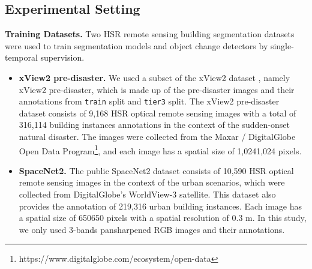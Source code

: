\documentclass[10pt,twocolumn,letterpaper]{article}
\begin{document}
\subsection{Experimental Setting}


\noindent\textbf{Training Datasets.}
Two HSR remote sensing building segmentation datasets were used to train segmentation models and object change detectors by single-temporal supervision.
\begin{itemize}
    \vspace{-0.1in}
    \item \textbf{xView2 pre-disaster.} We used a subset of the xView2 dataset \cite{gupta2019creating}, namely xView2 pre-disaster, which is made up of the pre-disaster images and their annotations from \texttt{train} split and \texttt{tier3} split.
          The xView2 pre-disaster dataset consists of 9,168 HSR optical remote sensing images with a total of 316,114 building instances annotations in the context of the sudden-onset natural disaster.
          The images were collected from the Maxar / DigitalGlobe Open Data Program\footnote{https://www.digitalglobe.com/ecosystem/open-data}, and each image has a spatial size of 1,0241,024 pixels.
          \vspace{-0.1in}
    \item \textbf{SpaceNet2.}
          The public SpaceNet2 dataset \cite{van2018spacenet} consists of 10,590 HSR optical remote sensing images in the context of the urban scenarios, which were collected from DigitalGlobe's WorldView-3 satellite.
          This dataset also provides the annotation of 219,316 urban building instances.
          Each image has a spatial size of 650650 pixels with a spatial resolution of 0.3 m.
          In this study, we only used 3-bands pansharpened RGB images and their annotations.
\end{itemize}
\end{document}
